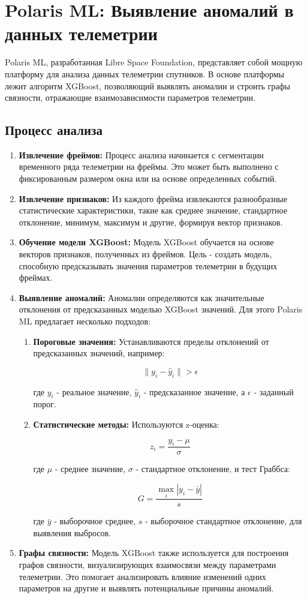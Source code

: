 \documentclass[12pt, a4paper]{extreport}
\begin{document}
\section{Polaris ML: Выявление аномалий в данных телеметрии}

Polaris ML, разработанная Libre Space Foundation, представляет собой мощную платформу для анализа данных телеметрии спутников. В основе платформы лежит алгоритм XGBoost, позволяющий выявлять аномалии и строить графы связности, отражающие взаимозависимости параметров телеметрии. 

\subsection{Процесс анализа}

\begin{enumerate}[label=\arabic*.]
\item \textbf{Извлечение фреймов:} Процесс анализа начинается с сегментации временного ряда телеметрии на фреймы. Это может быть выполнено с фиксированным размером окна или на основе определенных событий.
\item \textbf{Извлечение признаков:} Из каждого фрейма извлекаются разнообразные статистические характеристики, такие как среднее значение, стандартное отклонение, минимум, максимум и другие, формируя вектор признаков.
\item \textbf{Обучение модели XGBoost:} Модель XGBoost обучается на основе векторов признаков, полученных из фреймов. Цель - создать модель, способную предсказывать значения параметров телеметрии в будущих фреймах.
\item \textbf{Выявление аномалий:} Аномалии определяются как значительные отклонения от предсказанных моделью XGBoost значений. Для этого Polaris ML предлагает несколько подходов:
    \begin{enumerate}[label=\alph*.]
        \item \textbf{Пороговые значения:} Устанавливаются пределы отклонений от предсказанных значений, например:

        $$\| y_i - \hat{y}_i \| > \epsilon$$

        где $y_i$ - реальное значение, $\hat{y}_i$ - предсказанное значение, а $\epsilon$ - заданный порог.
        \item \textbf{Статистические методы:} Используются z-оценка:

        $$z_i = \frac{y_i - \mu}{\sigma}$$

        где $\mu$ - среднее значение, $\sigma$ - стандартное отклонение, и тест Граббса:

        $$G = \frac{\max_{i}|y_i - \bar{y}|}{s}$$

        где $\bar{y}$ - выборочное среднее, $s$ - выборочное стандартное отклонение, для выявления выбросов.
    \end{enumerate}
\item \textbf{Графы связности:} Модель XGBoost также используется для построения графов связности, визуализирующих взаимосвязи между параметрами телеметрии. Это помогает анализировать влияние изменений одних параметров на другие и выявлять потенциальные причины аномалий.
\end{enumerate}
\end{document}

